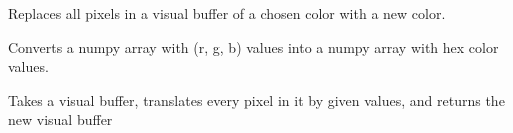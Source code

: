 \documentclass[letterpaper,10pt,english,openany,oneside]{sphinxmanual}
\begin{document}
\begin{fulllineitems}

\pysigstartsignatures
{}
\pysigstopsignatures
\sphinxAtStartPar
Replaces all pixels in a visual buffer of a chosen color with a new
color.

\end{fulllineitems}



\begin{fulllineitems}

\pysigstartsignatures
{}
\pysigstopsignatures
\sphinxAtStartPar
Converts a numpy array with (r, g, b) values into a numpy array with
hex color values.

\end{fulllineitems}



\begin{fulllineitems}

\pysigstartsignatures
{}
\pysigstopsignatures
\sphinxAtStartPar
Takes a visual buffer, translates every pixel in it by given values, and
returns the new visual buffer

\end{fulllineitems}




\renewcommand{\indexname}{Index}
\printindex
\end{document}
